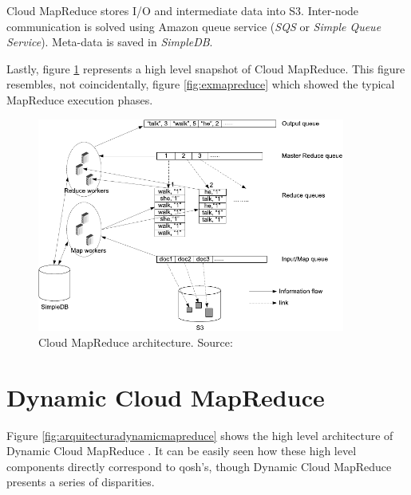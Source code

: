 Cloud MapReduce stores I/O and intermediate data into S3. Inter-node communication is solved using Amazon queue service (\emph{SQS} or \emph{Simple Queue Service}). Meta-data is saved in \emph{SimpleDB}.

Lastly, figure \ref{fig:arquitecturacloudmapreduce} represents a high level snapshot of Cloud MapReduce. This figure resembles, not coincidentally, figure \ref{fig:exmapreduce} which showed the typical MapReduce execution phases.

\begin{figure}[tbp]
\begin{center}
\includegraphics[width=0.9\textwidth]{imagenes/036.pdf}
 \caption{Cloud MapReduce architecture. Source: \cite{cloudmapreduce}}
\label{fig:arquitecturacloudmapreduce}
\end{center}
\end{figure}

\section{Dynamic Cloud MapReduce}\label{sec:dynamicmapreduce}
\noindent Figure \ref{fig:arquitecturadynamicmapreduce} shows the high level architecture of Dynamic Cloud MapReduce \cite{dynamicmapreduce}. It can be easily seen how these high level components directly correspond to qosh's, though Dynamic Cloud MapReduce presents a series of disparities.

